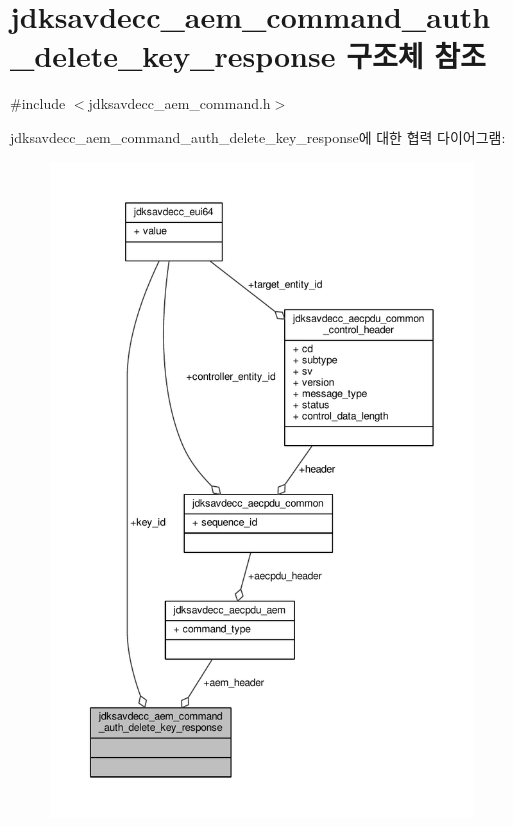 \hypertarget{structjdksavdecc__aem__command__auth__delete__key__response}{}\section{jdksavdecc\+\_\+aem\+\_\+command\+\_\+auth\+\_\+delete\+\_\+key\+\_\+response 구조체 참조}
\label{structjdksavdecc__aem__command__auth__delete__key__response}


{\ttfamily \#include $<$jdksavdecc\+\_\+aem\+\_\+command.\+h$>$}



jdksavdecc\+\_\+aem\+\_\+command\+\_\+auth\+\_\+delete\+\_\+key\+\_\+response에 대한 협력 다이어그램\+:
\nopagebreak
\begin{figure}[H]
\begin{center}
\leavevmode
\includegraphics[width=350pt]{structjdksavdecc__aem__command__auth__delete__key__response__coll__graph}
\end{center}
\end{figure}
